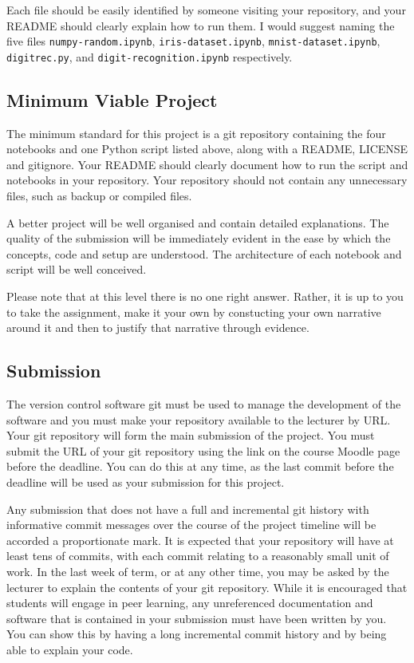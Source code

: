 \documentclass[12pt, a4paper]{article}
\begin{document}
Each file should be easily identified by someone visiting your repository, and your README should clearly explain how to run them.
I would suggest naming the five files \texttt{numpy-random.ipynb}, \texttt{iris-dataset.ipynb}, \texttt{mnist-dataset.ipynb}, \texttt{digitrec.py}, and \texttt{digit-recognition.ipynb} respectively.


\subsection*{Minimum Viable Project}
The minimum standard for this project is a git repository containing the four notebooks and one Python script listed above, along with a README, LICENSE and gitignore.
Your README should clearly document how to run the script and notebooks in your repository.
Your repository should not contain any unnecessary files, such as backup or compiled files.

A better project will be well organised and contain detailed explanations.
The quality of the submission will be immediately evident in the ease by which the concepts, code and setup are understood.
The architecture of each notebook and script will be well conceived.

Please note that at this level there is no one right answer.
Rather, it is up to you to take the assignment, make it your own by constucting your own narrative around it and then to justify that narrative through evidence.


\subsection*{Submission}
The version control software git must be used to manage the development of the software and you must make your repository available to the lecturer by URL.
Your git repository will form the main submission of the project.
You must submit the URL of your git repository using the link on the course Moodle page before the deadline.
You can do this at any time, as the last commit before the deadline will be used as your submission for this project.

Any submission that does not have a full and incremental git history with informative commit messages over the course of the project timeline will be accorded a proportionate mark.
It is expected that your repository will have at least tens of commits, with each commit relating to a reasonably small unit of work.
In the last week of term, or at any other time, you may be asked by the lecturer to explain the contents of your git repository.
While it is encouraged that students will engage in peer learning, any unreferenced documentation and software that is contained in your submission must have been written by you.
You can show this by having a long incremental commit history and by being able to explain your code.
\end{document}
